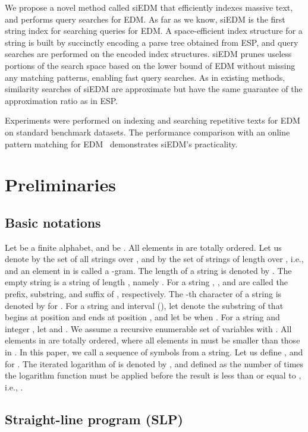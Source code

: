 \documentclass[12pt,a4paper]{scrartcl}
\begin{document}
We propose a novel method called siEDM that efficiently indexes massive text,
and performs query searches for EDM.  As far as we know, siEDM is the first
string index for searching queries for EDM.  A space-efficient index structure
for a string is built by succinctly encoding a parse tree obtained from ESP,
and query searches are performed on the encoded index structures.  siEDM
prunes useless portions of the search space based on the lower bound of
EDM without missing any matching patterns, enabling fast query searches.
As in existing methods, similarity searches of siEDM are approximate but have
the same guarantee of the approximation ratio as in ESP.

Experiments were performed on indexing and searching repetitive texts for EDM
on standard benchmark datasets.  The performance comparison with an online
pattern matching for EDM~\cite{Takabatake14-2} demonstrates siEDM's
practicality.


\section{Preliminaries}
\subsection{Basic notations}

Let  be a finite alphabet, and  be .  All elements
in  are totally ordered.  Let us denote by  the set of all
strings over , and by  the set of strings of length  over
, i.e.,  and an element in
 is called a -gram.  The length of a string  is denoted by
.  The empty string  is a string of length , namely
.  For a string , ,  and
 are called the prefix, substring, and suffix of , respectively.
The -th character of a string  is denoted by  for .
For a string  and interval  (), let
 denote the substring of  that begins at position  and ends at
position , and let  be  when .
For a string  and integer , let
 and .  
We assume a recursive enumerable set
 of variables with .  All elements in
 are totally ordered, where all elements in  must
be smaller than those in .  In this paper, we call a sequence of
symbols from  a string.  Let us define ,
and  for .  The iterated
logarithm of  is denoted by , and defined as the number of times
the logarithm function must be applied before the result is less than or equal
to , i.e., .

\subsection{Straight-line program (SLP)}
\end{document}
